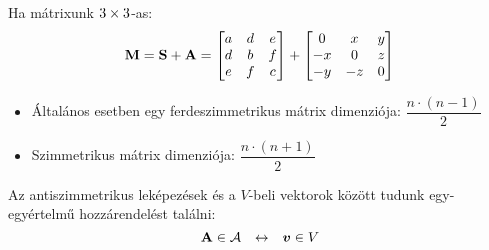 \documentclass[main.tex]{subfiles}
\begin{document}
Ha mátrixunk $3 \times 3$-as:
\begin{equation*}
  \mathbf{M}
  = \mathbf{S} + \mathbf{A}
  = \begin{bmatrix}
    a & d & e \\
    d & b & f \\
    e & f & c
  \end{bmatrix}
  + \begin{bmatrix}
    0  & x  & y \\
    -x & 0  & z \\
    -y & -z & 0
  \end{bmatrix}
\end{equation*}

\begin{itemize}
  \item Általános esetben
        egy ferdeszimmetrikus
        mátrix dimenziója:
        $\dfrac{n \cdot (n - 1)}{2}$

  \item Szimmetrikus mátrix dimenziója:
        $\dfrac{n \cdot (n + 1)}{2}$
\end{itemize}



Az antiszimmetrikus leképezések és a
$V$-beli vektorok között tudunk egy-egyértelmű
hozzárendelést találni:
\begin{equation*}
  \mathbf{A} \in \mathcal{A}
  \hspace{2.5mm} \leftrightarrow \hspace{2.5mm}
  \boldsymbol{v} \in V
\end{equation*}
\end{document}
